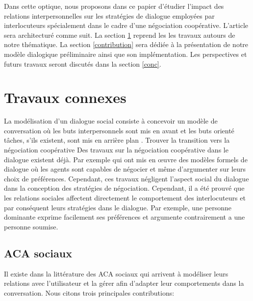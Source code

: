\documentclass [french]{sig-alternate-05-2015}
\begin{document}
\par Dans cette optique, nous proposons dans ce papier d'étudier l'impact des relations interpersonnelles sur les stratégies de dialogue employées par interlocuteurs spécialement dans le cadre d'une négociation coopérative. L'article sera architecturé comme suit. La section \ref{RW} reprend les les travaux autours de notre thématique. La section \ref{contribution} sera dédiée à la présentation de notre modèle dialogique préliminaire ainsi que son implémentation. Les perspectives et futurs travaux seront discutés dans la section \ref{conc}.

\section{Travaux connexes}
\label{RW}
La modélisation d'un dialogue social consiste à concevoir un modèle de conversation où les buts interpersonnels sont mis en avant et les buts orienté tâches, s'ils existent, sont mis en arrière plan \cite{bickmore2005social}. {\color{red} Trouver la transition vers la négociation coopérative}
Des travaux sur la négociation coopérative dans le dialogue existent déjà. Par exemple \cite{amgoud2000arguments, daskalopulu1998handling} qui ont mis en œuvre des modèles formels de dialogue où les agents sont capables de négocier et même d'argumenter sur leurs choix de préférences. Cependant, ces travaux négligent l'aspect social du dialogue dans la conception des stratégies de négociation. Cependant, il a été prouvé que les relations sociales affectent directement le comportement des interlocuteurs \cite{bickmore2000weather, bickmore2005establishing, moon1998intimate, nass2000does} et par conséquent leurs stratégies dans le dialogue. Par exemple, une personne dominante exprime facilement ses préférences et argumente contrairement a une personne soumise. 


\subsection{ACA sociaux}

\par Il existe dans la littérature des  ACA sociaux  qui arrivent à modéliser leurs relations avec l'utilisateur et la gérer afin d'adapter leur comportements dans la conversation. Nous citons trois principales contributions:
\end{document}
